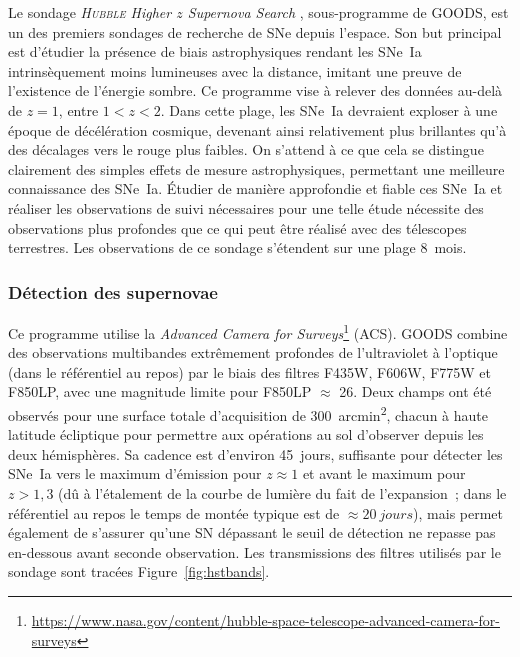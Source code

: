 \documentclass[../main/main.tex]{subfiles}
\begin{document}
Le sondage \textit{\textsc{Hubble} Higher $z$ Supernova
Search} \citep[HHZSS,][]{strolger2004}, sous-programme de GOODS, est un des
premiers sondages de recherche de SNe depuis l'espace. Son but principal est
d'étudier la présence de biais astrophysiques rendant les SNe~Ia intrinsèquement
moins lumineuses avec la distance, imitant une preuve de l'existence de
l'énergie sombre. Ce programme vise à relever des données au-delà de $z = 1$,
entre $1 < z < 2$. Dans cette plage, les SNe~Ia devraient exploser à une époque
de décélération cosmique, devenant ainsi relativement plus brillantes qu'à des
décalages vers le rouge plus faibles. On s'attend à ce que cela se distingue
clairement des simples effets de mesure astrophysiques, permettant une meilleure
connaissance des SNe~Ia. Étudier de manière approfondie et fiable ces SNe~Ia et
réaliser les observations de suivi nécessaires pour une telle étude nécessite
des observations plus profondes que ce qui peut être réalisé avec des télescopes
terrestres. Les observations de ce sondage s'étendent sur une plage
\SI{8}{mois}.

\subsubsection{Détection des supernovae}\label{sssec:hstdetec}

Ce programme utilise la \textit{Advanced Camera for
Surveys}\footnote{\href{https://www.nasa.gov/content/hubble-space-telescope-advanced-camera-for-surveys}
{https://www.nasa.gov/content/hubble-space-telescope-advanced-camera-for-surveys}}
(ACS). GOODS combine des observations multibandes extrêmement profondes de
l'ultraviolet à l'optique (dans le référentiel au repos) par le biais des
filtres F435W, F606W, F775W et F850LP, avec une magnitude limite pour F850LP
$\approx$ 26. Deux champs ont été observés pour une
surface totale d'acquisition de \SI{300}{arcmin^2}, chacun à haute latitude
écliptique pour permettre aux opérations au sol d'observer depuis les deux
hémisphères. Sa cadence est d'environ \SI{45}{jours}, suffisante pour détecter
les SNe~Ia vers le maximum d'émission pour $z \approx 1$ et avant le maximum
pour $z > 1,3$ (dû à l'étalement de la courbe de lumière du fait de
l'expansion~; dans le référentiel au repos le temps de montée typique est de
$\approx \SI{20}{jours}$), mais permet également de s'assurer qu'une SN
dépassant le seuil de détection ne repasse pas en-dessous avant seconde
observation. Les transmissions des filtres utilisés par le sondage sont tracées
Figure~\ref{fig:hstbands}.
\end{document}
